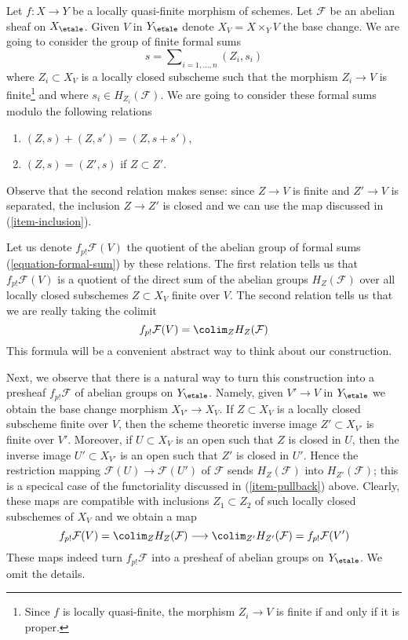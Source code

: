 \medskip\noindent
Let $f : X \to Y$ be a locally quasi-finite morphism of schemes.
Let $\mathcal{F}$ be an abelian sheaf on $X_\etale$. Given $V$ in
$Y_\etale$ denote $X_V = X \times_Y V$ the base change. We are going
to consider the group of finite formal sums
\begin{equation}
\label{equation-formal-sum}
s = \sum\nolimits_{i = 1, \ldots, n} (Z_i, s_i)
\end{equation}
where $Z_i \subset X_V$ is a locally closed subscheme such that the
morphism $Z_i \to V$ is finite\footnote{Since $f$ is locally quasi-finite,
the morphism $Z_i \to V$ is finite if and only if it is proper.}
and where $s_i \in H_{Z_i}(\mathcal{F})$.
We are going to consider these formal sums modulo the
following relations
\begin{enumerate}
\item
\label{item-sum}
$(Z, s) + (Z, s') = (Z, s + s')$,
\item
\label{item-sub}
$(Z, s) = (Z', s)$ if $Z \subset Z'$.
\end{enumerate}
Observe that the second relation makes sense: since $Z \to V$ is finite
and $Z' \to V$ is separated, the inclusion $Z \to Z'$ is closed and we
can use the map discussed in (\ref{item-inclusion}).

\medskip\noindent
Let us denote $f_{p!}\mathcal{F}(V)$ the quotient of the abelian
group of formal sums (\ref{equation-formal-sum}) by these relations.
The first relation tells us that $f_{p!}\mathcal{F}(V)$ is a quotient
of the direct sum of the abelian groups $H_Z(\mathcal{F})$
over all locally closed subschemes $Z \subset X_V$ finite over $V$.
The second relation tells us that we are really taking the colimit
\begin{equation}
\label{equation-colimit-definition}
f_{p!}\mathcal{F}(V) = \colim_Z H_Z(\mathcal{F})
\end{equation}
This formula will be a convenient abstract way to think about
our construction.

\medskip\noindent
Next, we observe that there is a natural way to turn this construction
into a presheaf $f_{p!}\mathcal{F}$ of abelian groups on $Y_\etale$.
Namely, given $V' \to V$ in $Y_\etale$ we obtain the base change morphism
$X_{V'} \to X_V$. If $Z \subset X_V$ is a locally closed subscheme
finite over $V$, then the scheme theoretic inverse image $Z' \subset X_{V'}$
is finite over $V'$. Moreover, if $U \subset X_V$ is an open such
that $Z$ is closed in $U$, then the inverse image $U' \subset X_{V'}$
is an open such that $Z'$ is closed in $U'$. Hence the restriction
mapping $\mathcal{F}(U) \to \mathcal{F}(U')$ of $\mathcal{F}$
sends $H_Z(\mathcal{F})$ into $H_{Z'}(\mathcal{F})$; this is a specical
case of the functoriality discussed in (\ref{item-pullback}) above.
Clearly, these maps are compatible with inclusions
$Z_1 \subset Z_2$ of such locally closed subschemes of $X_V$ and
we obtain a map
$$
f_{p!}\mathcal{F}(V) = \colim_Z H_Z(\mathcal{F})
\longrightarrow
\colim_{Z'} H_{Z'}(\mathcal{F}) =
f_{p!}\mathcal{F}(V')
$$
These maps indeed turn $f_{p!}\mathcal{F}$ into a presheaf of abelian
groups on $Y_\etale$. We omit the details.

